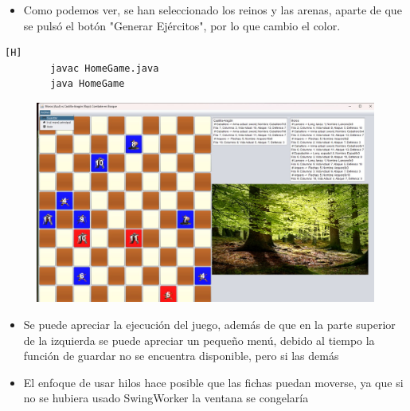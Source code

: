 \documentclass{article}
\begin{document}
	\begin{itemize}	
		\item Como podemos ver, se han seleccionado los reinos y las arenas, aparte de que se pulsó el botón "Generar Ejércitos", por lo que cambio el color.
	\end{itemize}
	
	
	
	
	\begin{lstlisting}[language=bash,caption={Interfaz del juego}][H]
		javac HomeGame.java
		java HomeGame
	\end{lstlisting}

	\begin{figure}[H]
		\centering
		\includegraphics[width=1\textwidth,keepaspectratio]{img/test.jpg}
	\end{figure}
	
	\begin{itemize}	
		\item Se puede apreciar la ejecución del juego, además de que en la parte superior de la izquierda se puede apreciar un pequeño menú, debido al tiempo la función de guardar no se encuentra disponible, pero si las demás
	\end{itemize}
	
	
	
	
	
	
	
	\begin{itemize}	
		\item El enfoque de usar hilos hace posible que las fichas puedan moverse, ya que si no se hubiera usado SwingWorker la ventana se congelaría 
	\end{itemize}
	
\end{document}
